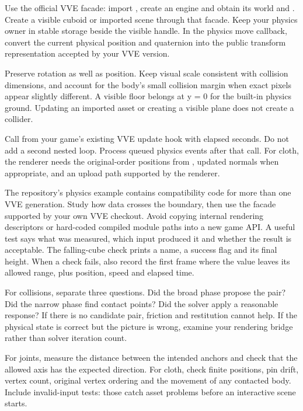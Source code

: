 \documentclass[11pt,a4paper]{article}
\begin{document}
Use the official VVE facade: import , create an engine and obtain its world and . Create a visible cuboid or imported scene through that facade. Keep your physics owner in stable storage beside the visible handle. In the physics move callback, convert the current physical position and quaternion into the public transform representation accepted by your VVE version.

Preserve rotation as well as position. Keep visual scale consistent with collision dimensions, and account for the body's small collision margin when exact pixels appear slightly different. A visible floor belongs at y = 0 for the built-in physics ground. Updating an imported asset or creating a visible plane does not create a collider.

Call  from your game's existing VVE update hook with elapsed seconds. Do not add a second nested  loop. Process queued physics events after that call. For cloth, the renderer needs the original-order positions from , updated normals when appropriate, and an upload path supported by the renderer.

The repository's physics example contains compatibility code for more than one VVE generation. Study how data crosses the boundary, then use the facade supported by your own VVE checkout. Avoid copying internal rendering descriptors or hard-coded compiled module paths into a new game API.
A useful test says what was measured, which input produced it and whether the result is acceptable. The falling-cube check prints a name, a success flag and its final height. When a check fails, also record the first frame where the value leaves its allowed range, plus position, speed and elapsed time.

For collisions, separate three questions. Did the broad phase propose the pair? Did the narrow phase find contact points? Did the solver apply a reasonable response? If there is no candidate pair, friction and restitution cannot help. If the physical state is correct but the picture is wrong, examine your rendering bridge rather than solver iteration count.

For joints, measure the distance between the intended anchors and check that the allowed axis has the expected direction. For cloth, check finite positions, pin drift, vertex count, original vertex ordering and the movement of any contacted body. Include invalid-input tests: those catch asset problems before an interactive scene starts.
\end{document}
